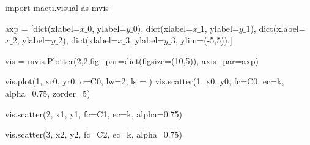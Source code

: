 \documentclass[
  letterpaper,
  DIV=11,
  numbers=noendperiod]{scrreprt}
\newenvironment{Shaded}{\begin{snugshade}}{\end{snugshade}}
\newcommand{\BuiltInTok}[1]{\textcolor[rgb]{0.00,0.23,0.31}{#1}}
\newcommand{\DecValTok}[1]{\textcolor[rgb]{0.68,0.00,0.00}{#1}}
\newcommand{\FloatTok}[1]{\textcolor[rgb]{0.68,0.00,0.00}{#1}}
\newcommand{\ImportTok}[1]{\textcolor[rgb]{0.00,0.46,0.62}{#1}}
\newcommand{\NormalTok}[1]{\textcolor[rgb]{0.00,0.23,0.31}{#1}}
\newcommand{\OperatorTok}[1]{\textcolor[rgb]{0.37,0.37,0.37}{#1}}
\newcommand{\StringTok}[1]{\textcolor[rgb]{0.13,0.47,0.30}{#1}}
\begin{document}
\begin{Shaded}
\begin{Highlighting}[]
\ImportTok{import}\NormalTok{ macti.visual }\ImportTok{as}\NormalTok{ mvis}

\NormalTok{axp }\OperatorTok{=}\NormalTok{ [}\BuiltInTok{dict}\NormalTok{(xlabel}\OperatorTok{=}\StringTok{\textquotesingle{}$x\_0$\textquotesingle{}}\NormalTok{, ylabel}\OperatorTok{=}\StringTok{\textquotesingle{}$y\_0$\textquotesingle{}}\NormalTok{),}
        \BuiltInTok{dict}\NormalTok{(xlabel}\OperatorTok{=}\StringTok{\textquotesingle{}$x\_1$\textquotesingle{}}\NormalTok{, ylabel}\OperatorTok{=}\StringTok{\textquotesingle{}$y\_1$\textquotesingle{}}\NormalTok{),}
        \BuiltInTok{dict}\NormalTok{(xlabel}\OperatorTok{=}\StringTok{\textquotesingle{}$x\_2$\textquotesingle{}}\NormalTok{, ylabel}\OperatorTok{=}\StringTok{\textquotesingle{}$y\_2$\textquotesingle{}}\NormalTok{),}
        \BuiltInTok{dict}\NormalTok{(xlabel}\OperatorTok{=}\StringTok{\textquotesingle{}$x\_3$\textquotesingle{}}\NormalTok{, ylabel}\OperatorTok{=}\StringTok{\textquotesingle{}$y\_3$\textquotesingle{}}\NormalTok{, ylim}\OperatorTok{=}\NormalTok{(}\OperatorTok{{-}}\DecValTok{5}\NormalTok{,}\DecValTok{5}\NormalTok{)),]}

\NormalTok{vis }\OperatorTok{=}\NormalTok{ mvis.Plotter(}\DecValTok{2}\NormalTok{,}\DecValTok{2}\NormalTok{,fig\_par}\OperatorTok{=}\BuiltInTok{dict}\NormalTok{(figsize}\OperatorTok{=}\NormalTok{(}\DecValTok{10}\NormalTok{,}\DecValTok{5}\NormalTok{)), axis\_par}\OperatorTok{=}\NormalTok{axp)}

\NormalTok{vis.plot(}\DecValTok{1}\NormalTok{, xr0, yr0, c}\OperatorTok{=}\StringTok{\textquotesingle{}C0\textquotesingle{}}\NormalTok{, lw}\OperatorTok{=}\DecValTok{2}\NormalTok{, ls }\OperatorTok{=} \StringTok{\textquotesingle{}{-}{-}\textquotesingle{}}\NormalTok{)}
\NormalTok{vis.scatter(}\DecValTok{1}\NormalTok{, x0, y0, fc}\OperatorTok{=}\StringTok{\textquotesingle{}C0\textquotesingle{}}\NormalTok{, ec}\OperatorTok{=}\StringTok{\textquotesingle{}k\textquotesingle{}}\NormalTok{, alpha}\OperatorTok{=}\FloatTok{0.75}\NormalTok{, zorder}\OperatorTok{=}\DecValTok{5}\NormalTok{)}

\NormalTok{vis.scatter(}\DecValTok{2}\NormalTok{, x1, y1, fc}\OperatorTok{=}\StringTok{\textquotesingle{}C1\textquotesingle{}}\NormalTok{, ec}\OperatorTok{=}\StringTok{\textquotesingle{}k\textquotesingle{}}\NormalTok{, alpha}\OperatorTok{=}\FloatTok{0.75}\NormalTok{)}

\NormalTok{vis.scatter(}\DecValTok{3}\NormalTok{, x2, y2, fc}\OperatorTok{=}\StringTok{\textquotesingle{}C2\textquotesingle{}}\NormalTok{, ec}\OperatorTok{=}\StringTok{\textquotesingle{}k\textquotesingle{}}\NormalTok{, alpha}\OperatorTok{=}\FloatTok{0.75}\NormalTok{)}


\end{Highlighting}
\end{Shaded}
\end{document}
